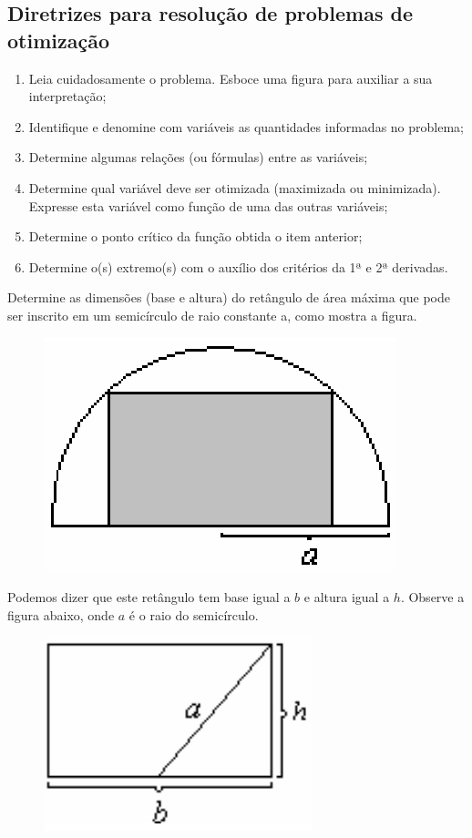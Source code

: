 \cleardoublepage\documentclass[../main.tex]{subfiles}
\begin{document}
\subsection{\hspace{-0.3cm}Diretrizes para resolução de problemas de otimização}
 \begin{enumerate}
\item Leia cuidadosamente o problema. Esboce uma figura para auxiliar a sua interpretação; 
\item Identifique e denomine com variáveis as quantidades informadas no problema; 
\item  Determine algumas relações (ou fórmulas) entre as variáveis; 
\item  Determine qual variável deve ser otimizada (maximizada ou minimizada). Expresse esta variável como função de uma das outras variáveis; 
\item Determine o ponto crítico da função obtida o item anterior; 
\item Determine o(s) extremo(s) com o auxílio dos critérios da 1ª  e 2ª derivadas. 
\end{enumerate}
\begin{ex}
 Determine as dimensões (base e altura) do retângulo de área máxima que pode ser 
inscrito em um semicírculo de raio constante a, como mostra a figura. 
\begin{figure}[H]
    \centering
    \includegraphics[scale=0.9]{fig_apl_deriv/RetInSemiCirc.png}
    \end{figure}
\end{ex}
Podemos dizer que este retângulo tem base igual a $b$ e altura igual a $h$. Observe a figura abaixo, onde $a$ é o raio do semicírculo.  
\begin{figure}[H]
    \centering
    \includegraphics{fig_apl_deriv/RetInSemiCirc2.png}
    \end{figure}
\end{document}
